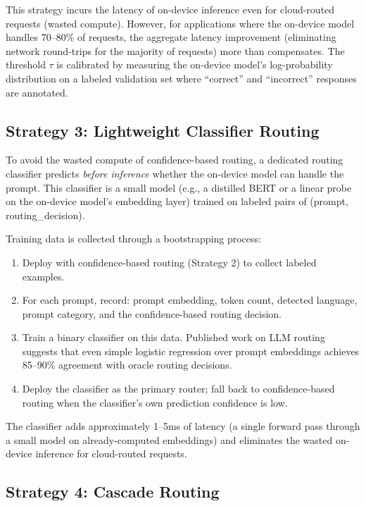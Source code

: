 \documentclass[12pt, letterpaper, twoside]{report}
\begin{document}
This strategy incurs the latency of on-device inference even for cloud-routed requests (wasted compute). However, for applications where the on-device model handles 70--80\% of requests, the aggregate latency improvement (eliminating network round-trips for the majority of requests) more than compensates. The threshold $\tau$ is calibrated by measuring the on-device model's log-probability distribution on a labeled validation set where ``correct'' and ``incorrect'' responses are annotated.

\subsection{Strategy 3: Lightweight Classifier Routing}
\label{subsec:classifier_routing}

To avoid the wasted compute of confidence-based routing, a dedicated routing classifier predicts \textit{before inference} whether the on-device model can handle the prompt. This classifier is a small model (e.g., a distilled BERT or a linear probe on the on-device model's embedding layer) trained on labeled pairs of (prompt, routing\_decision).

Training data is collected through a bootstrapping process:

\begin{enumerate}[itemsep=3pt]
\item Deploy with confidence-based routing (Strategy 2) to collect labeled examples.
\item For each prompt, record: prompt embedding, token count, detected language, prompt category, and the confidence-based routing decision.
\item Train a binary classifier on this data. Published work on LLM routing suggests that even simple logistic regression over prompt embeddings achieves 85--90\% agreement with oracle routing decisions.
\item Deploy the classifier as the primary router; fall back to confidence-based routing when the classifier's own prediction confidence is low.
\end{enumerate}

The classifier adds approximately 1--5ms of latency (a single forward pass through a small model on already-computed embeddings) and eliminates the wasted on-device inference for cloud-routed requests.

\subsection{Strategy 4: Cascade Routing}
\label{subsec:cascade_routing}
\end{document}
